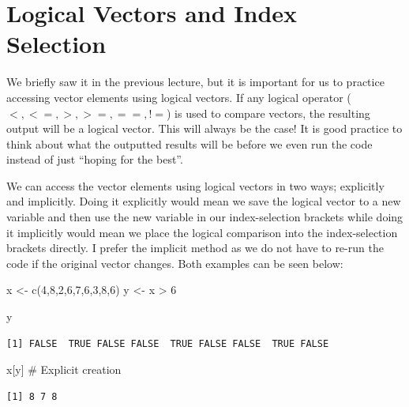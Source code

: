 \documentclass[
  letterpaper,
  DIV=11,
  numbers=noendperiod]{scrreprt}
\newenvironment{Shaded}{\begin{snugshade}}{\end{snugshade}}
\newcommand{\CommentTok}[1]{\textcolor[rgb]{0.37,0.37,0.37}{#1}}
\newcommand{\DecValTok}[1]{\textcolor[rgb]{0.68,0.00,0.00}{#1}}
\newcommand{\FunctionTok}[1]{\textcolor[rgb]{0.28,0.35,0.67}{#1}}
\newcommand{\NormalTok}[1]{\textcolor[rgb]{0.00,0.23,0.31}{#1}}
\newcommand{\OtherTok}[1]{\textcolor[rgb]{0.00,0.23,0.31}{#1}}
\newcommand{\SpecialCharTok}[1]{\textcolor[rgb]{0.37,0.37,0.37}{#1}}
\begin{document}
\section{Logical Vectors and Index
Selection}\label{logical-vectors-and-index-selection}

We briefly saw it in the previous lecture, but it is important for us to
practice accessing vector elements using logical vectors. If any logical
operator (\(<,<=, >, >=, ==, !=\)) is used to compare vectors, the
resulting output will be a logical vector. This will always be the case!
It is good practice to think about what the outputted results will be
before we even run the code instead of just ``hoping for the best''.

We can access the vector elements using logical vectors in two ways;
explicitly and implicitly. Doing it explicitly would mean we save the
logical vector to a new variable and then use the new variable in our
index-selection brackets while doing it implicitly would mean we place
the logical comparison into the index-selection brackets directly. I
prefer the implicit method as we do not have to re-run the code if the
original vector changes. Both examples can be seen below:

\begin{Shaded}
\begin{Highlighting}[]
\NormalTok{x }\OtherTok{\textless{}{-}} \FunctionTok{c}\NormalTok{(}\DecValTok{4}\NormalTok{,}\DecValTok{8}\NormalTok{,}\DecValTok{2}\NormalTok{,}\DecValTok{6}\NormalTok{,}\DecValTok{7}\NormalTok{,}\DecValTok{6}\NormalTok{,}\DecValTok{3}\NormalTok{,}\DecValTok{8}\NormalTok{,}\DecValTok{6}\NormalTok{)}
\NormalTok{y }\OtherTok{\textless{}{-}}\NormalTok{ x }\SpecialCharTok{\textgreater{}} \DecValTok{6}

\NormalTok{y}
\end{Highlighting}
\end{Shaded}

\begin{verbatim}
[1] FALSE  TRUE FALSE FALSE  TRUE FALSE FALSE  TRUE FALSE
\end{verbatim}

\begin{Shaded}
\begin{Highlighting}[]
\NormalTok{x[y] }\CommentTok{\# Explicit creation}
\end{Highlighting}
\end{Shaded}

\begin{verbatim}
[1] 8 7 8
\end{verbatim}
\end{document}
